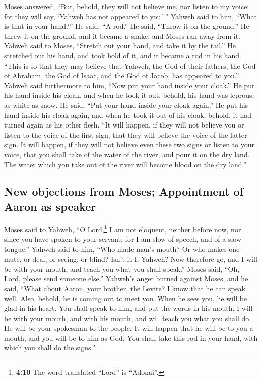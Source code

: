  Moses answered, ``But, behold, they will not believe me,
nor listen to my voice; for they will say, `Yahweh has not appeared to
you.'\,''  Yahweh said to him, ``What is that in your
hand?'' He said, ``A rod.''  He said, ``Throw it on the
ground.'' He threw it on the ground, and it became a snake; and Moses
ran away from it.  Yahweh said to Moses, ``Stretch out
your hand, and take it by the tail.'' He stretched out his hand, and
took hold of it, and it became a rod in his hand.  ``This
is so that they may believe that Yahweh, the God of their fathers, the
God of Abraham, the God of Isaac, and the God of Jacob, has appeared to
you.''  Yahweh said furthermore to him, ``Now put your
hand inside your cloak.'' He put his hand inside his cloak, and when he
took it out, behold, his hand was leprous, as white as snow.
 He said, ``Put your hand inside your cloak again.'' He
put his hand inside his cloak again, and when he took it out of his
cloak, behold, it had turned again as his other flesh. 
``It will happen, if they will not believe you or listen to the voice of
the first sign, that they will believe the voice of the latter sign.
 It will happen, if they will not believe even these two
signs or listen to your voice, that you shall take of the water of the
river, and pour it on the dry land. The water which you take out of the
river will become blood on the dry land.''

\hypertarget{new-objections-from-moses-appointment-of-aaron-as-speaker}{%
\subsection{New objections from Moses; Appointment of Aaron as
speaker}\label{new-objections-from-moses-appointment-of-aaron-as-speaker}}

 Moses said to Yahweh, ``O Lord,\footnote{\textbf{4:10}
  The word translated ``Lord'' is ``Adonai''.} I am not eloquent,
neither before now, nor since you have spoken to your servant; for I am
slow of speech, and of a slow tongue.''  Yahweh said to
him, ``Who made man's mouth? Or who makes one mute, or deaf, or seeing,
or blind? Isn't it I, Yahweh?  Now therefore go, and I
will be with your mouth, and teach you what you shall speak.''
 Moses said, ``Oh, Lord, please send someone else.''
 Yahweh's anger burned against Moses, and he said, ``What
about Aaron, your brother, the Levite? I know that he can speak well.
Also, behold, he is coming out to meet you. When he sees you, he will be
glad in his heart.  You shall speak to him, and put the
words in his mouth. I will be with your mouth, and with his mouth, and
will teach you what you shall do.  He will be your
spokesman to the people. It will happen that he will be to you a mouth,
and you will be to him as God.  You shall take this rod
in your hand, with which you shall do the signs.''

